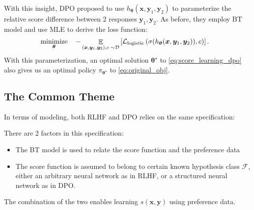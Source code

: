 \documentclass[11pt,a4paper]{article}
\begin{document}
With this insight, DPO proposed to use $h_{\boldsymbol \theta}(\bm{x}, \bm{y}_1, \bm{y}_2)$ to parameterize the relative score difference between 2 responses $\bm{y}_1, \bm{y}_2$. As before, they employ BT model and use MLE to derive the loss function:
\begin{align}
\label{eq:score_learning_dpo}
& \operatorname*{\text{minimize}}_{\boldsymbol \theta} \quad -\mathop{\mathbb{E}}_{(\bm{x}, \bm{y}_1, \bm{y}_2), c \; \sim \mathcal{D}} \left[\mathcal{L}_{\rm logistic}\left(\sigma(h_{\boldsymbol \theta}(\bm{x}, \bm{y}_1, \bm{y}_2)), c\right)\right].
\end{align}
With this parameterization, an optimal solution $\boldsymbol \theta^{\star }$ to \eqref{eq:score_learning_dpo} also gives us an optimal policy $\pi_{\boldsymbol \theta^{\star }}$ to \eqref{eq:original_obj}.

\subsection{The Common Theme}%
\label{sub:the_common_theme}
In terms of modeling, both RLHF and DPO relies on the same specification:
\begin{tcolorbox}[center]
\end{tcolorbox}

There are 2 factors in this specification:
\begin{itemize}
    \item The BT model is used to relate the score function and the preference data
    \item The score function is assumed to belong to certain known hypothesis class $\mathcal{F}$, either an arbitrary neural network as in RLHF, or a structured neural network as in DPO.
\end{itemize}
The combination of the two enables learning $s(\bm{x}, \bm{y})$ using preference data.
\end{document}
